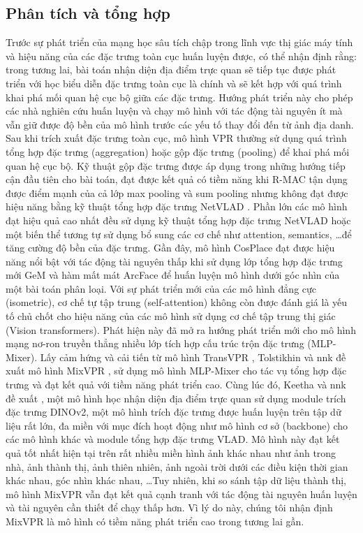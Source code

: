 \subsection{Phân tích và tổng hợp}

Trước sự phát triển của mạng học sâu tích chập trong lĩnh vực thị giác máy tính và hiệu năng của các đặc trưng toàn cục huấn luyện được, có thể nhận định rằng: trong tương lai, bài toán nhận diện địa điểm trực quan sẽ tiếp tục được phát triển với học biểu diễn đặc trưng toàn cục là chính và sẽ kết hợp với quá trình khai phá mối quan hệ cục bộ giữa các đặc trưng. Hướng phát triển này cho phép các nhà nghiên cứu huấn luyện và chạy mô hình với tác động tài nguyên ít mà vẫn giữ được độ bền của mô hình trước các yếu tố thay đổi đến từ ảnh địa danh. Sau khi trích xuất đặc trưng toàn cục, mô hình VPR thường sử dụng quá trình tổng hợp đặc trưng (aggregation) hoặc gộp đặc trưng (pooling) để khai phá mối quan hệ cục bộ. Kỹ thuật gộp đặc trưng được áp dụng trong những hướng tiếp cận đầu tiên cho bài toán, đạt được kết quả có tiềm năng khi R-MAC \cite{imageSearchKernel} tận dụng được điểm mạnh của cả lớp max pooling và sum pooling nhưng không đạt được hiệu năng bằng kỹ thuật tổng hợp đặc trưng NetVLAD \cite{arandjelovic2016netvlad}. Phần lớn các mô hình đạt hiệu quả cao nhất đều sử dụng kỹ thuật tổng hợp đặc trưng NetVLAD hoặc một biến thể tương tự sử dụng bổ sung các cơ chế như attention, semantics, \dots để tăng cường độ bền của đặc trưng. Gần đây, mô hình CosPlace \cite{berton2022rethinking} đạt được hiệu năng nổi bật với tác động tài nguyên thấp khi sử dụng lớp tổng hợp đặc trưng mới GeM \cite{GeM} và hàm mất mát ArcFace \cite{Deng_2022} để huấn luyện mô hình dưới góc nhìn của một bài toán phân loại. Với sự phát triển mới của các mô hình đẳng cực (isometric), cơ chế tự tập trung (self-attention) không còn được đánh giá là yếu tố chủ chốt cho hiệu năng của các mô hình sử dụng cơ chế tập trung thị giác (Vision transformers). Phát hiện này đã mở ra hướng phát triển mới cho mô hình mạng nơ-ron truyền thẳng nhiều lớp tích hợp cấu trúc trộn đặc trưng (MLP-Mixer). Lấy cảm hứng và cải tiến từ mô hình TransVPR \cite{wang2022transvpr}, Tolstikhin và nnk đề xuất mô hình MixVPR \cite{alibey2023mixvpr}, sử dụng mô hình MLP-Mixer cho tác vụ tổng hợp đặc trưng và đạt kết quả với tiềm năng phát triển cao. Cùng lúc đó, Keetha và nnk đề xuất \cite{keetha2023anyloc}, một mô hình học nhận diện địa điểm trực quan sử dụng module trích đặc trưng DINOv2, một mô hình trích đặc trưng được huấn luyện trên tập dữ liệu rất lớn, đa miền với mục đích hoạt động như mô hình cơ sở (backbone) cho các mô hình khác và module tổng hợp đặc trưng VLAD. Mô hình này đạt kết quả tốt nhất hiện tại trên rất nhiều miền hình ảnh khác nhau như ảnh trong nhà, ảnh thành thị, ảnh thiên nhiên, ảnh ngoài trời dưới các điều kiện thời gian khác nhau, góc nhìn khác nhau, \dots Tuy nhiên, khi so sánh tập dữ liệu thành thị, mô hình MixVPR vẫn đạt kết quả cạnh tranh với tác động tài nguyên huấn luyện và tài nguyên cần thiết để chạy thấp hơn. Vì lý do này, chúng tôi nhận định MixVPR là mô hình có tiềm năng phát triển cao trong tương lai gần.
